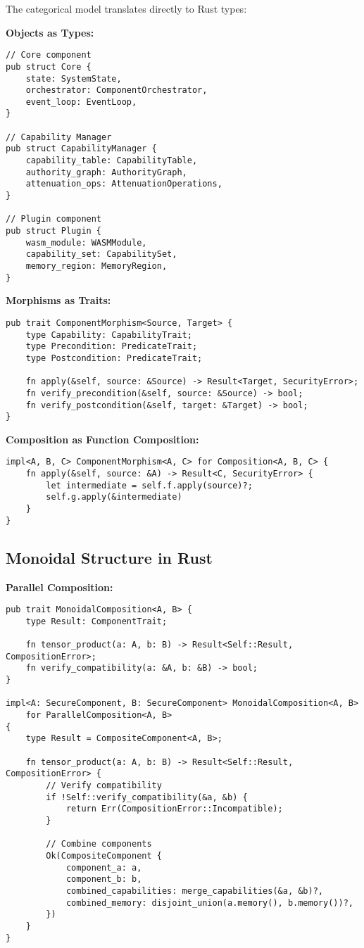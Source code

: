 The categorical model translates directly to Rust types:

\textbf{Objects as Types:}
\begin{lstlisting}[style=rust]
// Core component
pub struct Core {
    state: SystemState,
    orchestrator: ComponentOrchestrator,
    event_loop: EventLoop,
}

// Capability Manager
pub struct CapabilityManager {
    capability_table: CapabilityTable,
    authority_graph: AuthorityGraph,
    attenuation_ops: AttenuationOperations,
}

// Plugin component
pub struct Plugin {
    wasm_module: WASMModule,
    capability_set: CapabilitySet,
    memory_region: MemoryRegion,
}
\end{lstlisting}

\textbf{Morphisms as Traits:}
\begin{lstlisting}[style=rust]
pub trait ComponentMorphism<Source, Target> {
    type Capability: CapabilityTrait;
    type Precondition: PredicateTrait;
    type Postcondition: PredicateTrait;
    
    fn apply(&self, source: &Source) -> Result<Target, SecurityError>;
    fn verify_precondition(&self, source: &Source) -> bool;
    fn verify_postcondition(&self, target: &Target) -> bool;
}
\end{lstlisting}

\textbf{Composition as Function Composition:}
\begin{lstlisting}[style=rust]
impl<A, B, C> ComponentMorphism<A, C> for Composition<A, B, C> {
    fn apply(&self, source: &A) -> Result<C, SecurityError> {
        let intermediate = self.f.apply(source)?;
        self.g.apply(&intermediate)
    }
}
\end{lstlisting}

\subsection{Monoidal Structure in Rust}

\textbf{Parallel Composition:}
\begin{lstlisting}[style=rust]
pub trait MonoidalComposition<A, B> {
    type Result: ComponentTrait;
    
    fn tensor_product(a: A, b: B) -> Result<Self::Result, CompositionError>;
    fn verify_compatibility(a: &A, b: &B) -> bool;
}

impl<A: SecureComponent, B: SecureComponent> MonoidalComposition<A, B> 
    for ParallelComposition<A, B> 
{
    type Result = CompositeComponent<A, B>;
    
    fn tensor_product(a: A, b: B) -> Result<Self::Result, CompositionError> {
        // Verify compatibility
        if !Self::verify_compatibility(&a, &b) {
            return Err(CompositionError::Incompatible);
        }
        
        // Combine components
        Ok(CompositeComponent {
            component_a: a,
            component_b: b,
            combined_capabilities: merge_capabilities(&a, &b)?,
            combined_memory: disjoint_union(a.memory(), b.memory())?,
        })
    }
}
\end{lstlisting}

